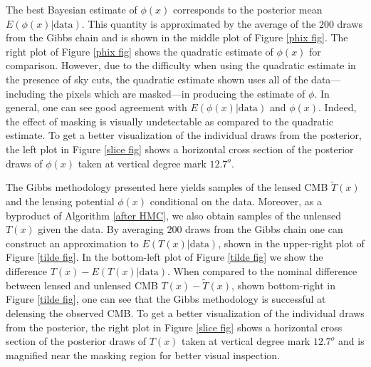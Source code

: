 \documentclass[iop,revtex4,apj,onecolumn]{emulateapj}
\begin{document}
The best Bayesian estimate of $\phi(x)$ corresponds to the posterior mean $E(\phi(x) |\text{data})$. This quantity is approximated by the average of the $200$ draws from the Gibbs chain and is shown in the middle plot of Figure \ref{phix fig}.  The right plot of Figure \ref{phix fig} shows the quadratic estimate of $\phi(x)$ for comparison. However, due to the difficulty when using the quadratic estimate in the presence of sky cuts, the quadratic estimate shown uses all of the data---including the pixels which are masked---in producing the estimate of $\phi$. In general, one can see good agreement with $E(\phi(x) | \text{data})$  and $\phi(x)$. Indeed, the effect of masking is visually undetectable as compared to the quadratic estimate.  To get a better visualization of the individual draws from the posterior, the left plot in Figure \ref{slice fig} shows a horizontal cross section of the posterior draws of $\phi(x)$ taken at vertical degree mark $12.7^o$. 


The Gibbs methodology presented here yields samples of the lensed CMB $\widetilde T(x)$ and the lensing potential $\phi(x)$ conditional on the data. Moreover, as a byproduct of Algorithm \ref{after HMC}, we also obtain samples of the unlensed $T(x)$ given the data. By averaging $200$ draws from the Gibbs chain one can construct an approximation to $E(T(x) | \text{data})$, shown in the upper-right plot of Figure \ref{tilde fig}. In the bottom-left plot of Figure \ref{tilde fig} we show the  difference $T(x) - E(T(x) | \text{data})$.
When compared to the nominal difference between lensed and unlensed CMB $T(x) - \widetilde T(x)$, shown bottom-right in Figure \ref{tilde fig}, one can see that the Gibbs methodology is successful at delensing the observed CMB. To get a better visualization of the individual draws from the posterior, the right plot in Figure \ref{slice fig} shows a horizontal cross section of the posterior draws of $T(x)$ taken at vertical degree mark $12.7^o$ and is magnified near the masking region for better visual inspection.  
\end{document}
